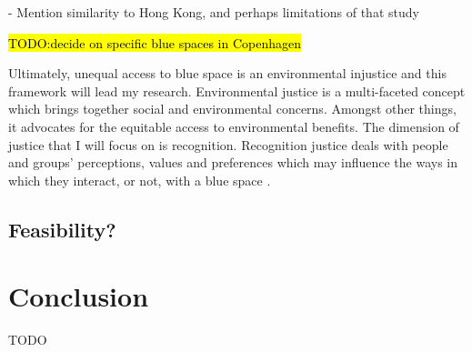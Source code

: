 \documentclass{article}
\begin{document}
- Mention similarity to Hong Kong, and perhaps limitations of that study

\hl{TODO:decide on specific blue spaces in Copenhagen}

Ultimately, unequal access to blue space is an environmental injustice and this framework will lead my research. Environmental justice is a multi-faceted concept which brings together social and environmental concerns. Amongst other things, it advocates for the equitable access to environmental benefits. The dimension of justice that I will focus on is recognition. Recognition justice deals with people and groups’ perceptions, values and preferences which may influence the ways in which they interact, or not, with a blue space \parencite{anguelovski2020expanding}.

\subsection{Feasibility?}

\section{Conclusion}

TODO

\printbibliography
\end{document}
